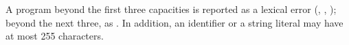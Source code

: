 A program beyond the first three capacities is reported as a lexical error
(, ,
); beyond the next three, as
.  In addition, an identifier or a string
literal may have at most 255 characters.

